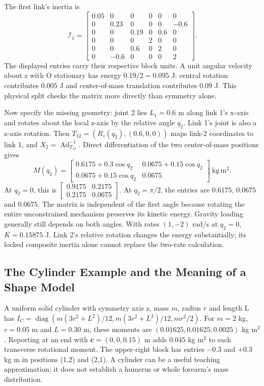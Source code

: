 The first link's inertia is
\begin{equation}
\mathcal I_1=\begin{bmatrix}
0.05&0&0&0&0&0\\
0&0.23&0&0&0&-0.6\\
0&0&0.19&0&0.6&0\\
0&0&0&2&0&0\\
0&0&0.6&0&2&0\\
0&-0.6&0&0&0&2
\end{bmatrix}.
\end{equation}
The displayed entries carry their respective block units. A unit angular velocity about z with O stationary has energy $0.19/2=0.095$ J: central rotation contributes $0.005$ J and center-of-mass translation contributes $0.09$ J. This physical split checks the matrix more directly than symmetry alone.

Now specify the missing geometry: joint 2 lies $L_1=0.6$ m along link 1's x-axis and rotates about the local z-axis by the relative angle $q_2$. Link 1's joint is also a z-axis rotation. Then $T_{12}=(R_z(q_2),(0.6,0,0))$ maps link-2 coordinates to link 1, and $X_2=\operatorname{Ad}_{T_{12}}^{-1}$. Direct differentiation of the two center-of-mass positions gives
\begin{equation}
M(q_2)=\begin{bmatrix}
0.6175+0.3\cos q_2&0.0675+0.15\cos q_2\\
0.0675+0.15\cos q_2&0.0675
\end{bmatrix}\ \mathrm{kg\,m^2}.
\end{equation}
At $q_2=0$, this is $\left[\begin{smallmatrix}0.9175&0.2175\\0.2175&0.0675\end{smallmatrix}\right]$. At $q_2=\pi/2$, the entries are $0.6175$, $0.0675$ and $0.0675$. The matrix is independent of the first angle because rotating the entire unconstrained mechanism preserves its kinetic energy. Gravity loading generally still depends on both angles. With rates $(1,-2)$ rad/s at $q_2=0$, $K=0.15875$ J. Link 2's relative rotation changes the energy substantially; its locked composite inertia alone cannot replace the two-rate calculation.

\subsection{The Cylinder Example and the Meaning of a Shape Model}

A uniform solid cylinder with symmetry axis z, mass $m$, radius $r$ and length L has $I_C=\operatorname{diag}(m(3r^2+L^2)/12,m(3r^2+L^2)/12,mr^2/2)$. For $m=2$ kg, $r=0.05$ m and $L=0.30$ m, these moments are $(0.01625,0.01625,0.0025)$ kg m$^2$. Reporting at an end with $\mathbf c=(0,0,0.15)$ m adds $0.045$ kg m$^2$ to each transverse rotational moment. The upper-right block has entries $-0.3$ and $+0.3$ kg m in positions (1,2) and (2,1). A cylinder can be a useful teaching approximation; it does not establish a humerus or whole forearm's mass distribution.

